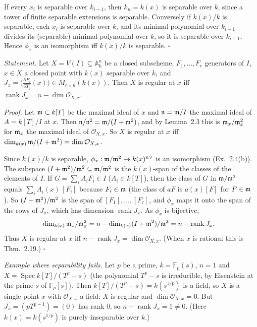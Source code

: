 \documentclass[11pt]{article}
\begin{document}
If every $x_i$ is separable over $k_{i-1}$, then $k_n=k(x)$ is separable over $k$, since a tower of finite separable extensions is separable. Conversely if $k(x)/k$ is separable, each $x_i$ is separable over $k$, and its minimal polynomial over $k_{i-1}$ divides its (separable) minimal polynomial over $k$, so it is separable over $k_{i-1}$. Hence $\phi_x$ is an isomorphism iff $k(x)/k$ is separable. \hfill$\square$

\pf
\emph{Statement.} Let $X=V(I)\subseteq\mathbb A^n_k$ be a closed subscheme, $F_1,\dots,F_r$ generators of $I$, $x\in X$ a closed point with $k(x)$ separable over $k$, and $J_x=\bigl(\frac{\partial F_i}{\partial T_j}(x)\bigr)\in M_{r\times n}(k(x))$. Then $X$ is regular at $x$ iff $\operatorname{rank}J_x=n-\dim\mathcal O_{X,x}$.

\emph{Proof.} Let $\mathfrak m\subset k[T]$ be the maximal ideal of $x$ and $\mathfrak n=\mathfrak m/I$ the maximal ideal of $A=k[T]/I$ at $x$. Then $\mathfrak n/\mathfrak n^2=\mathfrak m/(I+\mathfrak m^2)$, and by Lemma~2.3 this is $\mathfrak m_x/\mathfrak m_x^2$ for $\mathfrak m_x$ the maximal ideal of $\mathcal O_{X,x}$. So $X$ is regular at $x$ iff $\dim_{k(x)}\mathfrak m/(I+\mathfrak m^2)=\dim\mathcal O_{X,x}$.

Since $k(x)/k$ is separable, $\phi_x:\mathfrak m/\mathfrak m^2\to k(x)^{n\vee}$ is an isomorphism (Ex.~2.4(b)). The subspace $(I+\mathfrak m^2)/\mathfrak m^2\subseteq\mathfrak m/\mathfrak m^2$ is the $k(x)$-span of the classes of the elements of $I$. If $G=\sum_iA_iF_i\in I$ ($A_i\in k[T]$), then the class of $G$ in $\mathfrak m/\mathfrak m^2$ equals $\sum_iA_i(x)\,[F_i]$ because $F_i\in\mathfrak m$ (the class of $aF$ is $a(x)[F]$ for $F\in\mathfrak m$). So $(I+\mathfrak m^2)/\mathfrak m^2$ is the span of $[F_1],\dots,[F_r]$, and $\phi_x$ maps it onto the span of the rows of $J_x$, which has dimension $\operatorname{rank}J_x$. As $\phi_x$ is bijective,
\[ \dim_{k(x)}\mathfrak m_x/\mathfrak m_x^2=n-\dim_{k(x)}(I+\mathfrak m^2)/\mathfrak m^2=n-\operatorname{rank}J_x. \]
Thus $X$ is regular at $x$ iff $n-\operatorname{rank}J_x=\dim\mathcal O_{X,x}$. (When $x$ is rational this is Thm.~2.19.) \hfill$\square$

\emph{Example where separability fails.} Let $p$ be a prime, $k=\mathbb F_p(s)$, $n=1$ and $X=\operatorname{Spec}k[T]/(T^p-s)$ (the polynomial $T^p-s$ is irreducible, by Eisenstein at the prime $s$ of $\mathbb F_p[s]$). Then $k[T]/(T^p-s)=k(s^{1/p})$ is a field, so $X$ is a single point $x$ with $\mathcal O_{X,x}$ a field: $X$ is regular and $\dim\mathcal O_{X,x}=0$. But $J_x=(pT^{p-1})=(0)$ has rank $0$, so $n-\operatorname{rank}J_x=1\ne0$. (Here $k(x)=k(s^{1/p})$ is purely inseparable over $k$.)
\end{document}
